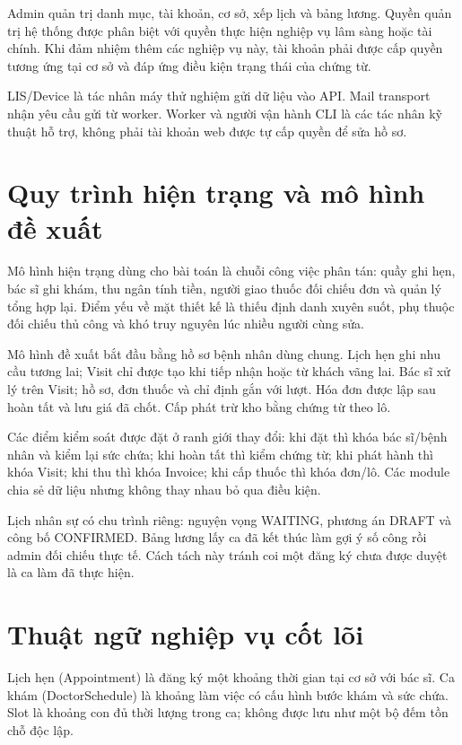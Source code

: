 Admin quản trị danh mục, tài khoản, cơ sở, xếp lịch và bảng lương.\allowbreak{} Quyền quản trị hệ thống được phân biệt với quyền thực hiện nghiệp vụ lâm sàng hoặc tài chính.\allowbreak{} Khi đảm nhiệm thêm các nghiệp vụ này, tài khoản phải được cấp quyền tương ứng tại cơ sở và đáp ứng điều kiện trạng thái của chứng từ.\allowbreak{}

LIS/\allowbreak{}Device là tác nhân máy thử nghiệm gửi dữ liệu vào API.\allowbreak{} Mail transport nhận yêu cầu gửi từ worker.\allowbreak{} Worker và người vận hành CLI là các tác nhân kỹ thuật hỗ trợ, không phải tài khoản web được tự cấp quyền để sửa hồ sơ.\allowbreak{}


\section{Quy trình hiện trạng và mô hình đề xuất}
Mô hình hiện trạng dùng cho bài toán là chuỗi công việc phân tán:\allowbreak{} quầy ghi hẹn, bác sĩ ghi khám, thu ngân tính tiền, người giao thuốc đối chiếu đơn và quản lý tổng hợp lại.\allowbreak{} Điểm yếu về mặt thiết kế là thiếu định danh xuyên suốt, phụ thuộc đối chiếu thủ công và khó truy nguyên lúc nhiều người cùng sửa.\allowbreak{}

Mô hình đề xuất bắt đầu bằng hồ sơ bệnh nhân dùng chung.\allowbreak{} Lịch hẹn ghi nhu cầu tương lai; Visit chỉ được tạo khi tiếp nhận hoặc từ khách vãng lai.\allowbreak{} Bác sĩ xử lý trên Visit; hồ sơ, đơn thuốc và chỉ định gắn với lượt.\allowbreak{} Hóa đơn được lập sau hoàn tất và lưu giá đã chốt.\allowbreak{} Cấp phát trừ kho bằng chứng từ theo lô.\allowbreak{}

Các điểm kiểm soát được đặt ở ranh giới thay đổi:\allowbreak{} khi đặt thì khóa bác sĩ/\allowbreak{}bệnh nhân và kiểm lại sức chứa; khi hoàn tất thì kiểm chứng từ; khi phát hành thì khóa Visit; khi thu thì khóa Invoice; khi cấp thuốc thì khóa đơn/\allowbreak{}lô.\allowbreak{} Các module chia sẻ dữ liệu nhưng không thay nhau bỏ qua điều kiện.\allowbreak{}

Lịch nhân sự có chu trình riêng:\allowbreak{} nguyện vọng WAITING, phương án DRAFT và công bố CONFIRMED.\allowbreak{} Bảng lương lấy ca đã kết thúc làm gợi ý số công rồi admin đối chiếu thực tế.\allowbreak{} Cách tách này tránh coi một đăng ký chưa được duyệt là ca làm đã thực hiện.\allowbreak{}


\section{Thuật ngữ nghiệp vụ cốt lõi}
Lịch hẹn (Appointment) là đăng ký một khoảng thời gian tại cơ sở với bác sĩ.\allowbreak{} Ca khám (Doctor\allowbreak{}Schedule) là khoảng làm việc có cấu hình bước khám và sức chứa.\allowbreak{} Slot là khoảng con đủ thời lượng trong ca; không được lưu như một bộ đếm tồn chỗ độc lập.\allowbreak{}

